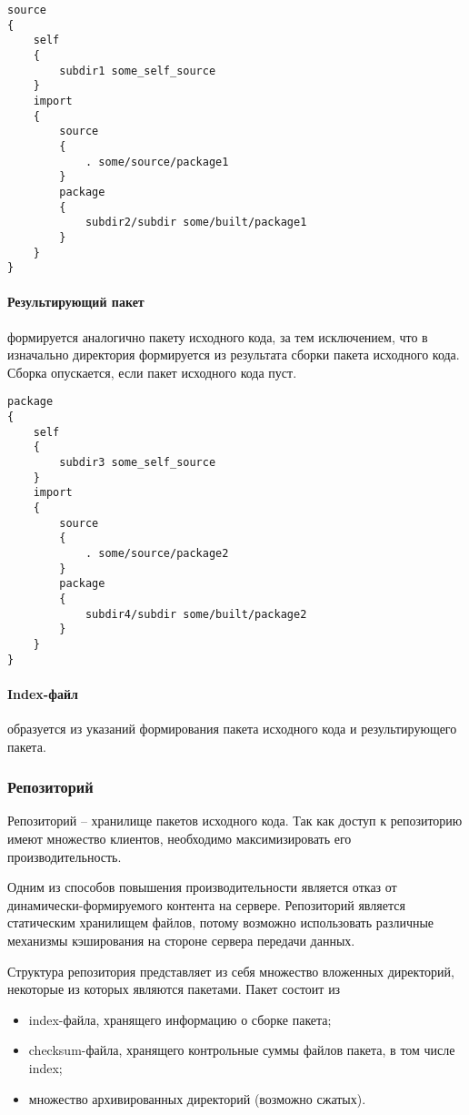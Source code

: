\begin{verbatim}
source
{
    self
    {
        subdir1 some_self_source
    }
    import
    {
        source
        {
            . some/source/package1
        }
        package
        {
            subdir2/subdir some/built/package1
        }
    }
}
\end{verbatim}

\paragraph{Результирующий пакет} формируется аналогично пакету исходного кода,
за тем исключением, что в изначально директория формируется из результата сборки
пакета исходного кода. Сборка опускается, если пакет исходного кода пуст.

\begin{verbatim}
package
{
    self
    {
        subdir3 some_self_source
    }
    import
    {
        source
        {
            . some/source/package2
        }
        package
        {
            subdir4/subdir some/built/package2
        }
    }
}
\end{verbatim}

\paragraph{Index-файл} образуется из указаний формирования пакета исходного кода
и результирующего пакета.

\subsubsection{Репозиторий}
Репозиторий -- хранилище пакетов исходного кода.
Так как доступ к репозиторию имеют множество клиентов,
необходимо максимизировать его производительность.

Одним из способов повышения производительности является отказ
от динамически-формируемого контента на сервере. Репозиторий
является статическим хранилищем файлов, потому возможно использовать
различные механизмы кэширования на стороне сервера передачи данных.

Структура репозитория представляет из себя множество вложенных директорий,
некоторые из которых являются пакетами. Пакет состоит из
\begin{itemize}
    \item index-файла, хранящего информацию о сборке пакета;
    \item checksum-файла, хранящего контрольные суммы файлов пакета, в том числе index;
    \item множество архивированных директорий (возможно сжатых).
\end{itemize}

